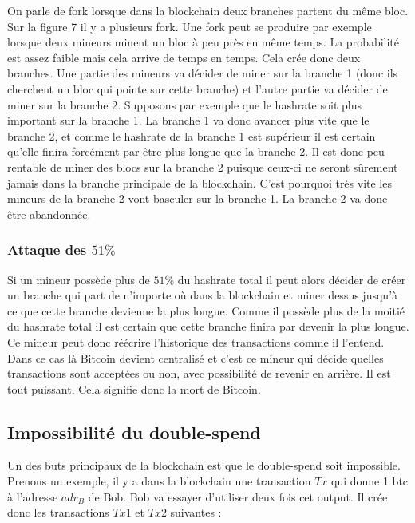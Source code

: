 \documentclass[11pt,a4paper]{article}
\begin{document}
On parle de fork lorsque dans la blockchain deux branches partent du même bloc. Sur la figure 7 il y a plusieurs fork. Une fork peut se produire par exemple lorsque deux mineurs minent un bloc à peu près en même temps. La probabilité est assez faible mais cela arrive de temps en temps. Cela crée donc deux branches. Une partie des mineurs va décider de miner sur la branche 1 (donc ils cherchent un bloc qui pointe sur cette branche) et l'autre partie va décider de miner sur la branche 2. Supposons par exemple que le hashrate soit plus important sur la branche 1. La branche 1 va donc avancer plus vite que le branche 2, et comme le hashrate de la branche 1 est supérieur il est certain qu'elle finira forcément par être plus longue que la branche 2. Il est donc peu rentable de miner des blocs sur la branche 2 puisque ceux-ci ne seront sûrement jamais dans la branche principale de la blockchain. C'est pourquoi très vite les mineurs de la branche 2 vont basculer sur la branche 1. La branche 2 va donc être abandonnée.

\subsubsection{Attaque des $51\%$}

Si un mineur possède plus de $51\%$ du hashrate total il peut alors décider de créer un branche qui part de n'importe où dans la blockchain et miner dessus jusqu'à ce que cette branche devienne la plus longue. Comme il possède plus de la moitié du hashrate total il est certain que cette branche finira par devenir la plus longue. Ce mineur peut donc réécrire l'historique des transactions comme il l'entend. Dans ce cas là Bitcoin devient centralisé et c'est ce mineur qui décide quelles transactions sont acceptées ou non, avec possibilité de revenir en arrière. Il est tout puissant. Cela signifie donc la mort de Bitcoin.


\subsection{Impossibilité du double-spend}

Un des buts principaux de la blockchain est que le double-spend soit impossible. Prenons un exemple, il y a dans la blockchain une transaction $Tx$ qui donne 1 btc à l'adresse $adr_B$ de Bob. Bob va essayer d'utiliser deux fois cet output. Il crée donc les transactions $Tx1$ et $Tx2$ suivantes :
\end{document}
